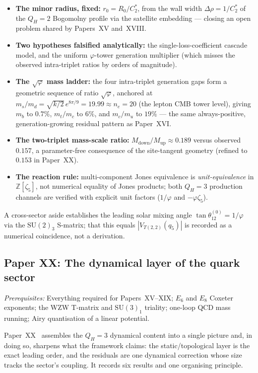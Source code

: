 \documentclass[11pt,a4paper]{article}
\newcommand{\vp}{\varphi}
\newcommand{\ZZ}{\mathbb{Z}}
\begin{document}
\begin{itemize}[noitemsep]
\item \textbf{The minor radius, fixed:} $r_0=R_0/C_2^*$, from the wall width
  $\Delta\rho=1/C_2^*$ of the $Q_H=2$ Bogomolny profile via the satellite
  embedding --- closing an open problem shared by Papers~XV and~XVIII.
\item \textbf{Two hypotheses falsified analytically:} the single-loss-coefficient
  cascade model, and the uniform $\vp$-tower generation multiplier (which misses
  the observed intra-triplet ratios by orders of magnitude).
\item \textbf{The $\sqrt\vp$ mass ladder:} the four intra-triplet generation
  gaps form a geometric sequence of ratio $\sqrt\vp$, anchored at
  $m_s/m_d=\sqrt{k/2}\,e^{8\pi/9}=19.99\approx n_e=20$ (the lepton CMB tower
  level), giving $m_b$ to $0.7\%$, $m_t/m_c$ to $6\%$, and $m_c/m_u$ to $19\%$
  --- the same always-positive, generation-growing residual pattern as
  Paper~XVI.
\item \textbf{The two-triplet mass-scale ratio:}
  $M_{\mathrm{down}}/M_{\mathrm{up}}\approx0.189$ versus observed $0.157$, a
  parameter-free consequence of the site-tangent geometry (refined to $0.153$
  in Paper~XX).
\item \textbf{The reaction rule:} multi-component Jones equivalence is
  \emph{unit-equivalence} in $\ZZ[\zeta_5]$, not numerical equality of Jones
  products; both $Q_H=3$ production channels are verified with explicit unit
  factors ($1/\vp$ and $-\vp\zeta_5$).
\end{itemize}
A cross-sector aside establishes the leading solar mixing angle
$\tan\theta_{12}^{(0)}=1/\vp$ via the $\mathrm{SU}(2)_3$ S-matrix; that this
equals $|V_{T(2,2)}(q_5)|$ is recorded as a numerical coincidence, not a
derivation.

\subsection{Paper XX: The dynamical layer of the quark sector}

\textit{Prerequisites:} Everything required for Papers~XV--XIX; $E_6$ and
$E_8$ Coxeter exponents; the WZW T-matrix and $\mathrm{SU}(3)_1$ triality;
one-loop QCD mass running; Airy quantisation of a linear potential.

Paper~XX~\cite{Paper20} assembles the $Q_H=3$ dynamical content into a single
picture and, in doing so, sharpens what the framework claims: the
static/topological layer is the exact leading order, and the residuals are one
dynamical correction whose size tracks the sector's coupling. It records six
results and one organising principle.
\end{document}
